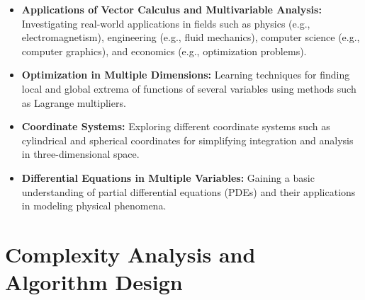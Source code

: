 \documentclass[openany]{book}
\begin{document}
\begin{itemize}
    \item \textbf{Applications of Vector Calculus and Multivariable Analysis:} Investigating real-world applications in fields such as physics (e.g., electromagnetism), engineering (e.g., fluid mechanics), computer science (e.g., computer graphics), and economics (e.g., optimization problems).
    \item \textbf{Optimization in Multiple Dimensions:} Learning techniques for finding local and global extrema of functions of several variables using methods such as Lagrange multipliers.
    \item \textbf{Coordinate Systems:} Exploring different coordinate systems such as cylindrical and spherical coordinates for simplifying integration and analysis in three-dimensional space.
    \item \textbf{Differential Equations in Multiple Variables:} Gaining a basic understanding of partial differential equations (PDEs) and their applications in modeling physical phenomena.
\end{itemize}
\section{Complexity Analysis and Algorithm Design}
\end{document}
